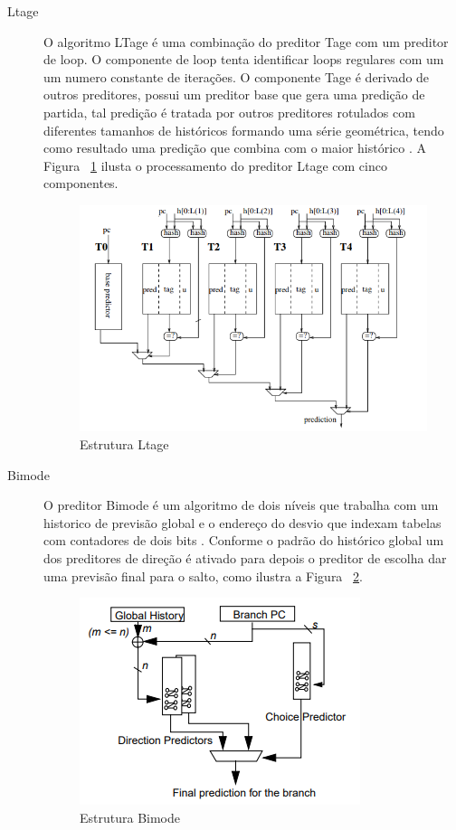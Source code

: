 \documentclass[12pt]{article}
\begin{document}
\begin{description}
\item[Ltage]

O algoritmo LTage é uma combinação do preditor Tage com um preditor de loop. O componente de loop tenta identificar loops regulares com um um numero constante de iterações. O componente Tage é derivado de outros preditores, possui um preditor base que gera uma predição de partida, tal predição é tratada por outros preditores rotulados com diferentes tamanhos de históricos formando uma série geométrica, tendo como resultado uma predição que combina com o maior histórico \cite{seznec2007256}. A Figura ~\ref{fig:ltage} ilusta o processamento do preditor Ltage com  cinco componentes.

\begin{figure}[H]
\centering
\includegraphics[width=.5\textwidth]{Imagens/ltage.PNG}
\caption{Estrutura Ltage}
\label{fig:ltage}
\end{figure}

\item[Bimode]

O preditor Bimode é um algoritmo de dois níveis que trabalha com um historico de previsão global e o endereço do desvio que indexam tabelas com contadores de dois bits \cite{lee1997bi}. Conforme o padrão do histórico global um dos preditores de direção é ativado para depois o preditor de escolha dar uma previsão final para o salto, como ilustra a Figura ~\ref{fig:bimode}.

\begin{figure}[H]
\centering
\includegraphics[width=.5\textwidth]{Imagens/bimode.PNG}
\caption{Estrutura Bimode}
\label{fig:bimode}
\end{figure}


\end{description}
\end{document}
